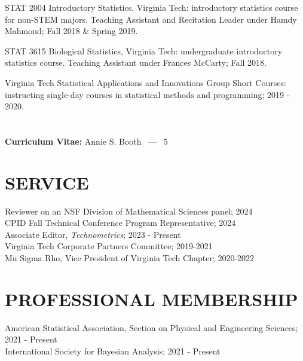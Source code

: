 \documentclass[margin,line,11pt]{res}
\begin{document}
\begin{resume}
{\sc STAT 2004 Introductory Statistics, Virginia Tech}: introductory statistics course for non-STEM majors.  Teaching Assistant and Recitation Leader under Hamdy Mahmoud; Fall 2018 \& Spring 2019.

{\sc STAT 3615 Biological Statistics, Virginia Tech}: undergraduate introductory statistics course.  Teaching Assistant under Frances McCarty; Fall 2018.

{\sc Virginia Tech Statistical Applications and Innovations Group Short Courses}: instructing single-day courses in statistical methods and programming; 2019 - 2020.



\pagebreak
\section{}
\hfill {\bf Curriculum Vitae:} Annie S. Booth \  --- \  5
\medskip
\section{\bf SERVICE}

Reviewer on an NSF Division of Mathematical Sciences panel; 2024 \\
CPID Fall Technical Conference Program Representative; 2024 \\
Associate Editor, {\it Technometrics}; 2023 - Present \\
Virginia Tech Corporate Partners Committee; 2019-2021 \\
Mu Sigma Rho, Vice President of Virginia Tech Chapter; 2020-2022

\medskip
\section{\bf PROFESSIONAL MEMBERSHIP}

American Statistical Association, Section on Physical and Engineering Sciences; 2021 - Present \\
International Society for Bayesian Analysis; 2021 - Present \\

\end{resume}
\end{document}
